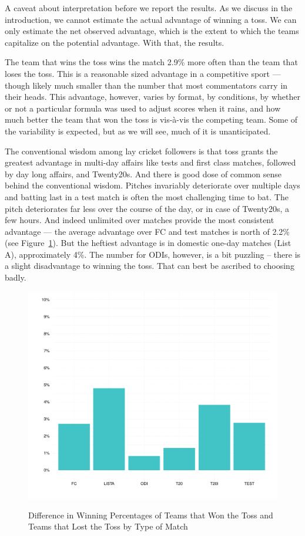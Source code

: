 \documentclass[12pt]{article}
\begin{document}
A caveat about interpretation before we report the results. As we discuss in the introduction, we cannot estimate the actual advantage of winning a toss. We can only estimate the net observed advantage, which is the extent to which the teams capitalize on the potential advantage. With that, the results.

The team that wins the toss wins the match 2.9\% more often than the team that loses the toss. This is a reasonable sized advantage in a competitive sport --- though likely much smaller than the number that most commentators carry in their heads. This advantage, however, varies by format, by conditions, by whether or not a particular formula was used to adjust scores when it rains, and how much better the team that won the toss is vis-\`{a}-vis the competing team. Some of the variability is expected, but as we will see, much of it is unanticipated. 

The conventional wisdom among lay cricket followers is that toss grants the greatest advantage in multi-day affairs like tests and first class matches, followed by day long affairs, and Twenty20s. And there is good dose of common sense behind the conventional wisdom. Pitches invariably deteriorate over multiple days and batting last in a test match is often the most challenging time to bat. The pitch deteriorates far less over the course of the day, or in case of Twenty20s, a few hours. And indeed unlimited over matches provide the most consistent advantage --- the average advantage over FC and test matches is north of 2.2\% (see Figure~\ref{fig:type}). But the heftiest advantage is in domestic one-day matches (List A), approximately 4\%. The number for ODIs, however, is a bit puzzling -- there is a slight disadvantage to winning the toss. That can best be ascribed to choosing badly.      

\begin{figure}[htbp]
\centering
\caption{Difference in Winning Percentages of Teams that Won the Toss and Teams that Lost the Toss by Type of Match}
\includegraphics[scale=.85]{../figs/winbyType.pdf}
\label{fig:type}
\end{figure}
\end{document}

